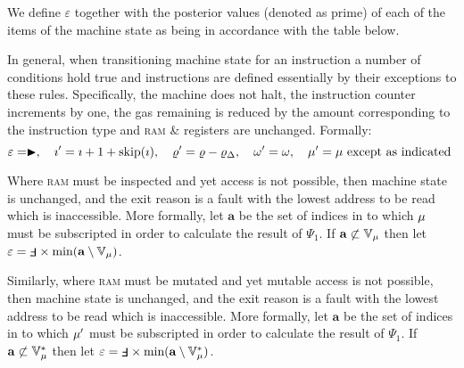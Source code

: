 We define $\varepsilon$ together with the posterior values (denoted as prime) of each of the items of the machine state as being in accordance with the table below.


In general, when transitioning machine state for an instruction a number of conditions hold true and instructions are defined essentially by their exceptions to these rules. Specifically, the machine does not halt, the instruction counter increments by one, the gas remaining is reduced by the amount corresponding to the instruction type and \textsc{ram} \& registers are unchanged. Formally:
\begin{equation}
  \varepsilon = \blacktriangleright,\quad \imath' = \imath + 1 + \text{skip}(\imath),\quad \varrho' = \varrho - \varrho_\Delta,\quad \omega' = \omega,\quad{\mu}' = {\mu} \text{ except as indicated }
\end{equation}

Where \textsc{ram} must be inspected and yet access is not possible, then machine state is unchanged, and the exit reason is a fault with the lowest address to be read which is inaccessible. More formally, let $\mathbf{a}$ be the set of indices in to which ${\mu}$ must be subscripted in order to calculate the result of $\Psi_1$. If $\mathbf{a} \not\subset \mathbb{V}_{\mu}$ then let $\varepsilon=\fault \times \text{min}(\mathbf{a} \setminus \mathbb{V}_\mem)$.

Similarly, where \textsc{ram} must be mutated and yet mutable access is not possible, then machine state is unchanged, and the exit reason is a fault with the lowest address to be read which is inaccessible. More formally, let $\mathbf{a}$ be the set of indices in to which ${\mu}'$ must be subscripted in order to calculate the result of $\Psi_1$. If $\mathbf{a} \not\subset \mathbb{V}^*_{\mu}$ then let $\varepsilon=\fault \times \text{min}(\mathbf{a} \setminus \mathbb{V}^*_\mem)$.

